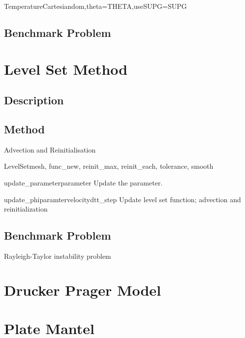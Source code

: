 \begin{classdesc}{TemperatureCartesian}{dom,theta=THETA,useSUPG=SUPG}
\end{classdesc}

\subsection{Benchmark Problem}


\section{Level Set Method}

\subsection{Description}

\subsection{Method}

Advection and Reinitialisation

\begin{classdesc}{LevelSet}{mesh, func\_new, reinit\_max, reinit\_each, tolerance, smooth}
\end{classdesc}



\begin{methoddesc}[LevelSet]{update\_parameter}{parameter}
Update the parameter.
\end{methoddesc}

\begin{methoddesc}[LevelSet]{update\_phi}{paramter}{velocity}{dt}{t\_step}
Update level set function; advection and reinitialization
\end{methoddesc}

\subsection{Benchmark Problem}

Rayleigh-Taylor instability problem


\section{Drucker Prager Model}

\section{Plate Mantel}
